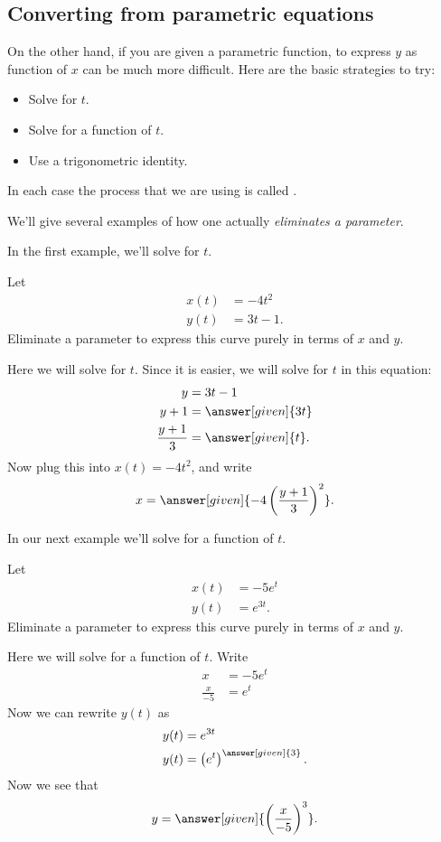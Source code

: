 \documentclass{ximera}
\begin{document}
\subsection{Converting from parametric equations}

On the other hand, if you are given a parametric function, to express
$y$ as function of $x$ can be much more difficult. Here are the basic
strategies to try:
\begin{itemize}
\item Solve for $t$.
\item Solve for a function of $t$.
\item Use a trigonometric identity.
\end{itemize}
In each case the process that we are using is called
.

We'll give several examples of how one actually \textit{eliminates a
  parameter}.

In the first example, we'll solve for $t$.
\begin{example}
  Let
  \begin{align*}
    x(t) &= -4 t^2\\
    y(t) &= 3t-1.
  \end{align*}
    Eliminate a parameter to express this curve purely in terms of $x$ and $y$.
  \begin{explanation}
    Here we will solve for $t$. Since it is easier, we will solve for
    $t$ in this equation:
    \begin{align*}
      y &= 3t-1\\
      y+1 &= \answer[given]{3t}\\
      \frac{y+1}{3} & = \answer[given]{t}.
    \end{align*}
    Now plug this into $x(t) = -4 t^2$, and write
    \[
    x = \answer[given]{-4 \left(\frac{y+1}{3}\right)^2}.
    \]
  \end{explanation}
\end{example}

In our next example we'll solve for a function of $t$.

\begin{example}
  Let
  \begin{align*}
    x(t) &= -5e^t\\
    y(t) &= e^{3t}.
  \end{align*}
    Eliminate a parameter to express this curve purely in terms of $x$
    and $y$.
    \begin{explanation}
      Here we will solve for a function of $t$. Write
      \begin{align*}
        x &= -5e^t\\
        \frac{x}{-5} &= e^t
      \end{align*}
      Now we can rewrite $y(t)$ as
      \begin{align*}
        y(t) &= e^{3t}\\
        y(t) &= \left(e^{t}\right)^{\answer[given]{3}}.
      \end{align*}
      Now we see that
      \[
      y = \answer[given]{\left(\frac{x}{-5}\right)^3}.
      \]
  \end{explanation}
\end{example}
\end{document}
